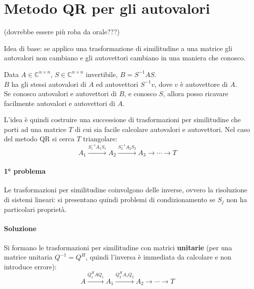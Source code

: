 \documentclass[12pt,a4paper,]{report}
\begin{document}
\begin{lezione}
    [Lezione 23 20/05]
\end{lezione}

\section{Metodo QR per gli autovalori}
\begin{nota}
    (dovrebbe essere più roba da orale???)
\end{nota}
\noindent
Idea di base: se applico una trasformazione di similitudine a una matrice gli autovalori non cambiano e gli autovettori cambiano in una maniera che conosco.

\begin{nota}
    Data $A \in \mathbb{C}^{n\times n}$, $S \in \mathbb{C}^{n\times n}$ invertibile, $B = S^{-1}AS$.\\
    $B$ ha gli stessi autovalori di $A$ ed autovettori $S^{-1}v$, dove $v$ è autovettore di $A$.\\
    Se conosco autovalori e autovettori di $B$, e conosco $S$, allora posso ricavare facilmente autovalori e autovettori di $A$.
\end{nota}

L'idea è quindi costruire una successione di trasformazioni per similitudine che porti ad una matrice $T$ di cui sia facile calcolare autovalori e autovettori. Nel caso del metodo QR si cerca $T$ triangolare:
\[
A_1 \xrightarrow{S_1^{-1}A_1S_1} A_2 \xrightarrow{S_2^{-1}A_2S_2} A_3 \longrightarrow \cdots \longrightarrow T
\]

\paragraph{1° problema}
Le trasformazioni per similitudine coinvolgono delle inverse, ovvero la risoluzione di sistemi lineari: si presentano quindi problemi di condizionamento se $S_j$ non ha particolari proprietà.

\paragraph{Soluzione}
Si formano le trasformazioni per similitudine con matrici \textbf{unitarie} (per una matrice unitaria $Q^{-1}=Q^H$, quindi l'inversa è immediata da calcolare e non introduce errore):
\[
A \xrightarrow{Q_1^HAQ_1} A_1 \xrightarrow{Q_2^HA_1Q_2} A_2 \longrightarrow \cdots \longrightarrow T
\]
\end{document}
